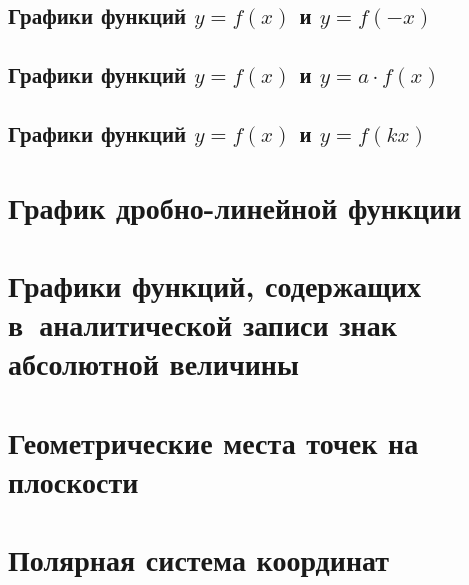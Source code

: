 \documentclass[14pt, oneside]{extbook}
\begin{document}
\subsection{Графики функций $y = f(x)$ и $y = f(-x)$}
\label{sec_1_10_5}
\subsection{Графики функций $y = f(x)$ и $y = a \cdot f(x)$}

\subsection{Графики функций $y = f(x)$ и $y = f(kx)$}

\section{График дробно-линейной функции}\label{sec_1_11}

\section{Графики функций, содержащих в~аналитической записи знак абсолютной величины}

\section{Геометрические места точек на плоскости}

\section{Полярная система координат}

\end{document}
